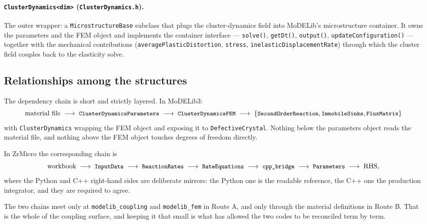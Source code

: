 \documentclass[11pt]{article}
\newcommand{\ZrM}{\textsf{ZrMicro}}
\newcommand{\MoD}{\textsf{MoDELib3}}
\newcommand{\code}[1]{\texttt{\small #1}}
\newcommand{\file}[1]{\texttt{\footnotesize #1}}
\begin{document}
\paragraph*{\code{ClusterDynamics<dim>} (\file{ClusterDynamics.h}).}
The outer wrapper: a \code{MicrostructureBase} subclass that plugs the
cluster-dynamics field into MoDELib's microstructure container. It owns the
parameters and the FEM object and implements the container interface ---
\code{solve()}, \code{getDt()}, \code{output()}, \code{updateConfiguration()} ---
together with the mechanical contributions (\code{averagePlasticDistortion},
\code{stress}, \code{inelasticDisplacementRate}) through which the cluster field
couples back to the elasticity solve.

\subsection{Relationships among the structures}

The dependency chain is short and strictly layered. In \MoD{}:
\begin{equation*}
\text{material file}
\;\longrightarrow\;
\code{ClusterDynamicsParameters}
\;\longrightarrow\;
\code{ClusterDynamicsFEM}
\;\longrightarrow\;
\{\code{SecondOrderReaction}, \code{ImmobileSinks}, \code{FluxMatrix}\}
\end{equation*}
with \code{ClusterDynamics} wrapping the FEM object and exposing it to
\code{DefectiveCrystal}. Nothing below the parameters object reads the material
file, and nothing above the FEM object touches degrees of freedom directly.

In \ZrM{} the corresponding chain is
\begin{equation*}
\text{workbook}
\;\longrightarrow\;
\code{InputData}
\;\longrightarrow\;
\code{ReactionRates}
\;\longrightarrow\;
\code{RateEquations}
\;\longrightarrow\;
\code{cpp\_bridge}
\;\longrightarrow\;
\code{Parameters}
\;\longrightarrow\;
\text{RHS},
\end{equation*}
where the Python and C++ right-hand sides are deliberate mirrors: the Python one
is the readable reference, the C++ one the production integrator, and they are
required to agree.

The two chains meet only at \code{modelib\_coupling} and \code{modelib\_fem} in
Route A, and only through the material definitions in Route B. That is the whole
of the coupling surface, and keeping it that small is what has allowed the two
codes to be reconciled term by term.
\end{document}
